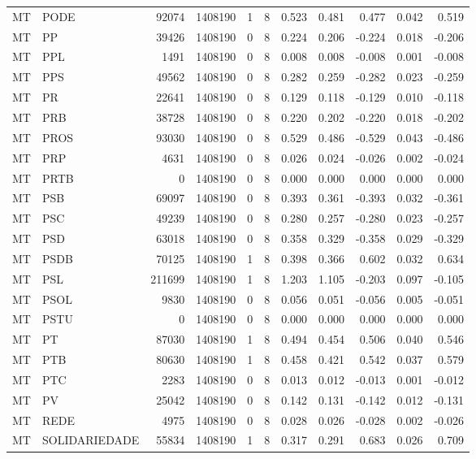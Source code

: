 \begin{landscape}
\begin{longtable}{llrrrrrrrrr}
MT & PODE & 92074 & 1408190 & 1 & 8 & 0.523 & 0.481 & 0.477 & 0.042 & 0.519 \\
MT & PP & 39426 & 1408190 & 0 & 8 & 0.224 & 0.206 & -0.224 & 0.018 & -0.206 \\
MT & PPL & 1491 & 1408190 & 0 & 8 & 0.008 & 0.008 & -0.008 & 0.001 & -0.008 \\
MT & PPS & 49562 & 1408190 & 0 & 8 & 0.282 & 0.259 & -0.282 & 0.023 & -0.259 \\
MT & PR & 22641 & 1408190 & 0 & 8 & 0.129 & 0.118 & -0.129 & 0.010 & -0.118 \\
MT & PRB & 38728 & 1408190 & 0 & 8 & 0.220 & 0.202 & -0.220 & 0.018 & -0.202 \\
MT & PROS & 93030 & 1408190 & 0 & 8 & 0.529 & 0.486 & -0.529 & 0.043 & -0.486 \\
MT & PRP & 4631 & 1408190 & 0 & 8 & 0.026 & 0.024 & -0.026 & 0.002 & -0.024 \\
MT & PRTB & 0 & 1408190 & 0 & 8 & 0.000 & 0.000 & 0.000 & 0.000 & 0.000 \\
MT & PSB & 69097 & 1408190 & 0 & 8 & 0.393 & 0.361 & -0.393 & 0.032 & -0.361 \\
MT & PSC & 49239 & 1408190 & 0 & 8 & 0.280 & 0.257 & -0.280 & 0.023 & -0.257 \\
MT & PSD & 63018 & 1408190 & 0 & 8 & 0.358 & 0.329 & -0.358 & 0.029 & -0.329 \\
MT & PSDB & 70125 & 1408190 & 1 & 8 & 0.398 & 0.366 & 0.602 & 0.032 & 0.634 \\
MT & PSL & 211699 & 1408190 & 1 & 8 & 1.203 & 1.105 & -0.203 & 0.097 & -0.105 \\
MT & PSOL & 9830 & 1408190 & 0 & 8 & 0.056 & 0.051 & -0.056 & 0.005 & -0.051 \\
MT & PSTU & 0 & 1408190 & 0 & 8 & 0.000 & 0.000 & 0.000 & 0.000 & 0.000 \\
MT & PT & 87030 & 1408190 & 1 & 8 & 0.494 & 0.454 & 0.506 & 0.040 & 0.546 \\
MT & PTB & 80630 & 1408190 & 1 & 8 & 0.458 & 0.421 & 0.542 & 0.037 & 0.579 \\
MT & PTC & 2283 & 1408190 & 0 & 8 & 0.013 & 0.012 & -0.013 & 0.001 & -0.012 \\
MT & PV & 25042 & 1408190 & 0 & 8 & 0.142 & 0.131 & -0.142 & 0.012 & -0.131 \\
MT & REDE & 4975 & 1408190 & 0 & 8 & 0.028 & 0.026 & -0.028 & 0.002 & -0.026 \\
MT & SOLIDARIEDADE & 55834 & 1408190 & 1 & 8 & 0.317 & 0.291 & 0.683 & 0.026 & 0.709 \\

\end{longtable}
\end{landscape}
